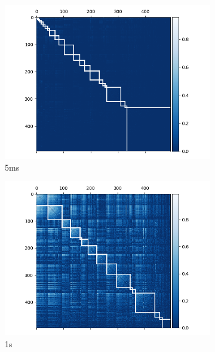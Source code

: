   \begin{figure}[p]
    \begin{subfigure}[h]{0.5\linewidth}
      \includegraphics[width=\linewidth]{figures/eight_probe/Krebs_0p005_absolute_cons_cluster_map.png}
      \caption{5ms}
      \label{fig:absolute_consensus_cluster_5ms}
    \end{subfigure}
    \begin{subfigure}[h]{0.5\linewidth}
      \includegraphics[width=\linewidth]{figures/eight_probe/Krebs_1p0_absolute_cons_cluster_map.png}
      \caption{1s}
      \label{fig:absolute_consensus_cluster_1s}
    \end{subfigure}
    \begin{subfigure}[h]{0.5\linewidth}

\end{subfigure}
\end{figure}
